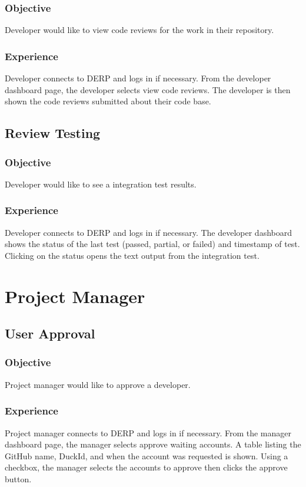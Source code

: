 \subsubsection*{Objective}
Developer would like to view code reviews for the work in their repository.
\subsubsection*{Experience}
Developer connects to DERP and logs in if necessary. From the developer dashboard page, the developer selects view code reviews. The developer is then shown the code reviews submitted about their code base.


\subsection*{Review Testing}
\subsubsection*{Objective}
Developer would like to see a integration test results.
\subsubsection*{Experience}
Developer connects to DERP and logs in if necessary. The developer dashboard shows the status of the last test (passed, partial, or failed) and timestamp of test. Clicking on the status opens the text output from the integration test.


\section*{Project Manager}
\subsection*{User Approval}
\subsubsection*{Objective}
Project manager would like to approve a developer.
\subsubsection*{Experience}
Project manager connects to DERP and logs in if necessary. From the manager dashboard page, the manager selects approve waiting accounts. A table listing the GitHub name, DuckId, and when the account was requested is shown. Using a checkbox, the manager selects the accounts to approve then clicks the approve button.


